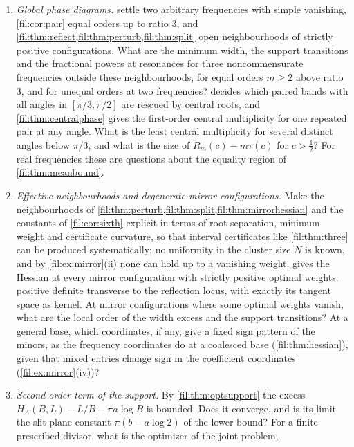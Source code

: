 \begin{enumerate}
\item \emph{Global phase diagrams.}  settle two arbitrary frequencies with
simple vanishing, \cref{fil:cor:pair} equal orders up to ratio $3$, and \cref{fil:thm:reflect,fil:thm:perturb,fil:thm:split}
open neighbourhoods of strictly positive configurations. What are the minimum width, the support transitions
and the fractional powers at resonances for three noncommensurate frequencies outside these neighbourhoods, for
equal orders $m\ge2$ above ratio $3$, and for unequal orders at two frequencies?  decides which
paired bands with all angles in $[\pi/3,\pi/2]$ are rescued by central roots, and \cref{fil:thm:centralphase} gives the
first-order central multiplicity for one repeated pair at any angle. What is the least central multiplicity for
several distinct angles below $\pi/3$, and what is the size of $R_m(c)-m\tau(c)$ for $c>\tfrac12$? For real
frequencies these are questions about the equality region of \cref{fil:thm:meanbound}.
\item \emph{Effective neighbourhoods and degenerate mirror configurations.} Make the neighbourhoods of
\cref{fil:thm:perturb,fil:thm:split,fil:thm:mirrorhessian} and the constants of \cref{fil:cor:sixth} explicit in terms of
root separation, minimum weight and certificate curvature, so that interval certificates like \cref{fil:thm:three} can be
produced systematically; no uniformity in the cluster size $N$ is known, and by \cref{fil:ex:mirror}\textup{(ii)} none
can hold up to a vanishing weight.  gives the Hessian at every mirror configuration with
strictly positive optimal weights: positive definite transverse to the reflection locus, with exactly its tangent
space as kernel. At mirror configurations where some optimal weights vanish, what are the local order of the width
excess and the support transitions? At a general base, which coordinates, if any, give a fixed sign pattern of
the minors, as the frequency coordinates do at a coalesced base (\cref{fil:thm:hessian}), given that mixed entries
change sign in the coefficient coordinates (\cref{fil:ex:mirror}\textup{(iv)})?
\item \emph{Second-order term of the support.} By \cref{fil:thm:optsupport} the excess
$H_\Lambda(B,L)-L/B-\pi a\log B$ is bounded. Does it converge, and is its limit the slit-plane constant
$\pi(b-a\log2)$ of the lower bound? For a finite prescribed divisor, what is the optimizer of the joint problem,

\end{enumerate}
